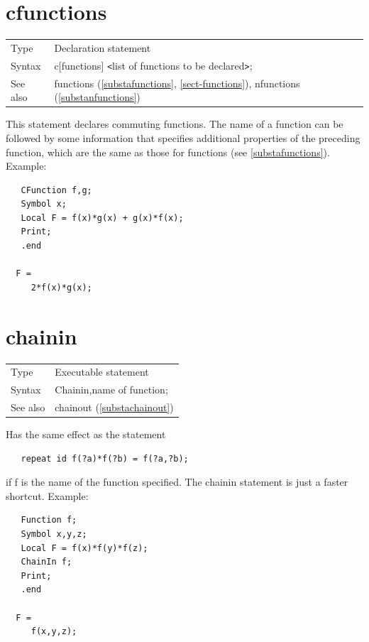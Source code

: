 \vspace{10mm}
%

\section{cfunctions}
\label{substacfunctions}

\noindent \begin{tabular}{ll}
Type & Declaration statement\\
Syntax & c[functions] {\tt<}list of functions to be declared{\tt>}; \\
See also & functions (\ref{substafunctions}, \ref{sect-functions}), nfunctions (\ref{substanfunctions})
\end{tabular} \vspace{4mm}

\noindent This statement declares commuting 
functions. The name of a 
function can be followed by some information that specifies additional 
properties of the preceding function, which are the same as
those for functions (see \ref{substafunctions}). Example:
\begin{verbatim}
   CFunction f,g;
   Symbol x;
   Local F = f(x)*g(x) + g(x)*f(x);
   Print;
   .end

  F =
     2*f(x)*g(x);
\end{verbatim}
\vspace{10mm}

 
\section{chainin}
\label{substachainin}

\noindent \begin{tabular}{ll}
Type & Executable statement\\
Syntax & Chainin,name of function;
\\ See also & chainout (\ref{substachainout})
\end{tabular} \vspace{4mm}

\noindent Has the same effect as the statement
\begin{verbatim}
   repeat id f(?a)*f(?b) = f(?a,?b);
\end{verbatim}
if f is the name of the function specified. The chainin statement is just a 
faster shortcut. Example:
\begin{verbatim}
   Function f;
   Symbol x,y,z;
   Local F = f(x)*f(y)*f(z);
   ChainIn f;
   Print;
   .end

  F =
     f(x,y,z);
\end{verbatim}
\vspace{10mm}

